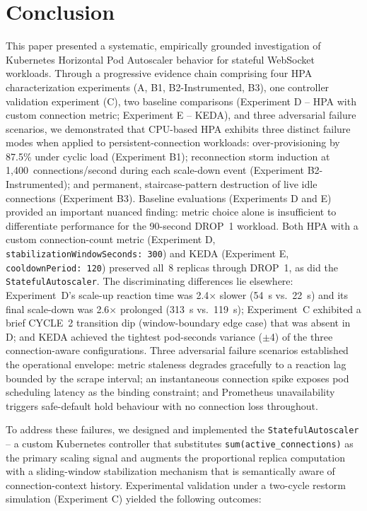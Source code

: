 \documentclass[twocolumn]{svjour3}
\begin{document}
\section{Conclusion}
\label{sec:conclusion}

This paper presented a systematic, empirically grounded investigation of Kubernetes Horizontal Pod Autoscaler behavior for stateful WebSocket workloads. Through a progressive evidence chain comprising four HPA characterization experiments (A, B1, B2-Instrumented, B3), one controller validation experiment (C), two baseline comparisons (Experiment D -- HPA with custom connection metric; Experiment E -- KEDA), and three adversarial failure scenarios, we demonstrated that CPU-based HPA exhibits three distinct failure modes when applied to persistent-connection workloads: over-provisioning by 87.5\% under cyclic load (Experiment B1); reconnection storm induction at 1,400~connections/second during each scale-down event (Experiment B2-Instrumented); and permanent, staircase-pattern destruction of live idle connections (Experiment B3). Baseline evaluations (Experiments D and E) provided an important nuanced finding: metric choice alone is insufficient to differentiate performance for the 90-second DROP~1 workload.  Both HPA with a custom connection-count metric (Experiment D, \texttt{stabilizationWindowSeconds:~300}) and KEDA (Experiment E, \texttt{cooldownPeriod:~120}) preserved all~8 replicas through DROP~1, as did the \texttt{StatefulAutoscaler}.  The discriminating differences lie elsewhere: Experiment~D's scale-up reaction time was 2.4$\times$ slower (54~s vs.~22~s) and its final scale-down was 2.6$\times$ prolonged (313~s vs.~119~s); Experiment~C exhibited a brief CYCLE~2 transition dip (window-boundary edge case) that was absent in D; and KEDA achieved the tightest pod-seconds variance ($\pm$4) of the three connection-aware configurations. Three adversarial failure scenarios established the operational envelope: metric staleness degrades gracefully to a reaction lag bounded by the scrape interval; an instantaneous connection spike exposes pod scheduling latency as the binding constraint; and Prometheus unavailability triggers safe-default hold behaviour with no connection loss throughout.

To address these failures, we designed and implemented the \texttt{StatefulAutoscaler} -- a custom Kubernetes controller that substitutes \texttt{sum(active\_connections)} as the primary scaling signal and augments the proportional replica computation with a sliding-window stabilization mechanism that is semantically aware of connection-context history. Experimental validation under a two-cycle restorm simulation (Experiment C) yielded the following outcomes:
\end{document}
